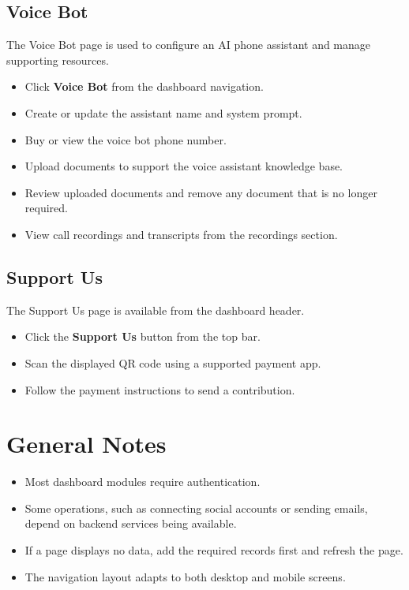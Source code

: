 \subsection{Voice Bot}
The Voice Bot page is used to configure an AI phone assistant and manage supporting resources.
\begin{itemize}
    \item Click \textbf{Voice Bot} from the dashboard navigation.
    \item Create or update the assistant name and system prompt.
    \item Buy or view the voice bot phone number.
    \item Upload documents to support the voice assistant knowledge base.
    \item Review uploaded documents and remove any document that is no longer required.
    \item View call recordings and transcripts from the recordings section.
\end{itemize}

\subsection{Support Us}
The Support Us page is available from the dashboard header.
\begin{itemize}
    \item Click the \textbf{Support Us} button from the top bar.
    \item Scan the displayed QR code using a supported payment app.
    \item Follow the payment instructions to send a contribution.
\end{itemize}

\section{General Notes}
\begin{itemize}
    \item Most dashboard modules require authentication.
    \item Some operations, such as connecting social accounts or sending emails, depend on backend services being available.
    \item If a page displays no data, add the required records first and refresh the page.
    \item The navigation layout adapts to both desktop and mobile screens.
\end{itemize}
